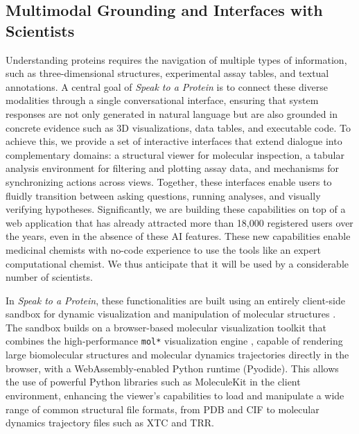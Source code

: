 \documentclass{article}
\begin{document}
\subsection{Multimodal Grounding and Interfaces with Scientists}\label{subsec:viewer}

Understanding proteins requires the navigation of multiple types of information, such as three-dimensional structures, experimental assay tables, and textual annotations. A central goal of \emph{Speak to a Protein} is to connect these diverse modalities through a single conversational interface, ensuring that system responses are not only generated in natural language but are also grounded in concrete evidence such as 3D visualizations, data tables, and executable code. To achieve this, we provide a set of interactive interfaces that extend dialogue into complementary domains: a structural viewer for molecular inspection, a tabular analysis environment for filtering and plotting assay data, and mechanisms for synchronizing actions across views. Together, these interfaces enable users to fluidly transition between asking questions, running analyses, and visually verifying hypotheses. Significantly, we are building these capabilities on top of a web application that has already attracted more than 18,000 registered users over the years, even in the absence of these AI features. These new capabilities enable medicinal chemists with no-code experience to use the tools like an expert computational chemist. We thus anticipate that it will be used by a considerable number of scientists.


In \emph{Speak to a Protein}, these functionalities are built using an entirely client-side sandbox for dynamic visualization and manipulation of molecular structures \citep{torrens2023playmolecule}. The sandbox builds on a browser-based molecular visualization toolkit that combines the high-performance \texttt{mol*} visualization engine \citep{Sehnal2021},  capable of rendering large biomolecular structures and molecular dynamics trajectories directly in the browser, with a WebAssembly-enabled Python runtime (Pyodide). This allows the use of powerful Python libraries such as MoleculeKit \citep{Doerr2016} in the client environment, enhancing the viewer's capabilities to load and manipulate a wide range of common structural file formats, from PDB and CIF to molecular dynamics trajectory files such as XTC and TRR. 
\end{document}
